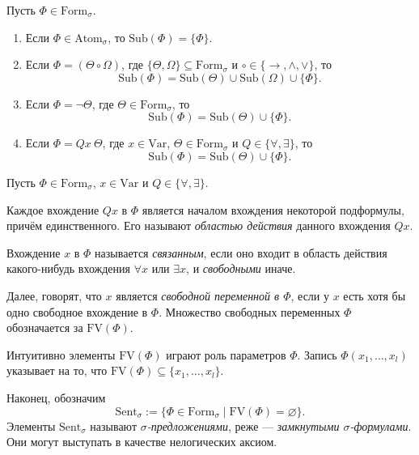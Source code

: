 \documentclass[12pt,a4paper]{article}
\newcommand{\Formul}{\ensuremath{\mathrm{Form}}\xspace}
\newcommand{\Sub}{\ensuremath{\mathrm{Sub}}\xspace}
\newcommand{\Var}{\ensuremath{\mathrm{Var}}\xspace}
\newcommand{\Atom}{\ensuremath{\mathrm{Atom}}\xspace}
\newcommand{\FV}{\ensuremath{\mathrm{FV}}\xspace}
\newcommand{\Sent}{\ensuremath{\mathrm{Sent}}\xspace}
\begin{document}
    \begin{theorem}[о подформулах]
        Пусть $\Phi \in \Formul_\sigma$.
        \begin{enumerate}
            \item Если $\Phi \in \Atom_\sigma$, то $\Sub(\Phi) = \{\Phi\}$.
            \item Если $\Phi = (\Theta \circ \Omega)$, где $\{\Theta, \Omega\} \subseteq \Formul_\sigma$ и ${\circ} \in \{{\rightarrow}, {\wedge}, {\vee}\}$, то
                \[\Sub(\Phi) = \Sub(\Theta) \cup \Sub(\Omega) \cup \{\Phi\}.\]
            \item Если $\Phi = \neg \Theta$, где $\Theta \in \Formul_\sigma$, то
                \[\Sub(\Phi) = \Sub(\Theta) \cup \{\Phi\}.\]
            \item Если $\Phi = Q x\ \Theta$, где $x \in \Var$, $\Theta \in \Formul_\sigma$ и $Q \in \{\forall, \exists\}$, то
                \[\Sub(\Phi) = \Sub(\Theta) \cup \{\Phi\}.\]
        \end{enumerate}
    \end{theorem}

    \begin{definition}
        Пусть $\Phi \in \Formul_\sigma$, $x \in \Var$ и $Q \in \{\forall, \exists\}$.

        Каждое вхождение $Qx$ в $\Phi$ является началом вхождения некоторой подформулы, причём единственного. Его называют \emph{областью действия} данного вхождения $Qx$.

        Вхождение $x$ в $\Phi$ называется \emph{связанным}, если оно входит в область действия какого-нибудь вхождения $\forall x$ или $\exists x$, и \emph{свободными} иначе.

        Далее, говорят, что $x$ является \emph{свободной переменной в $\Phi$}, если у $x$ есть хотя бы одно свободное вхождение в $\Phi$. Множество свободных переменных $\Phi$ обозначается за $\FV(\Phi)$.

        Интуитивно элементы $\FV(\Phi)$ играют роль параметров $\Phi$. Запись $\Phi(x_1, \dots, x_l)$ указывает на то, что $\FV(\Phi) \subseteq \{x_1, \dots, x_l\}$.

        Наконец, обозначим
        \[\Sent_\sigma := \{\Phi \in \Formul_\sigma \mid \FV(\Phi) = \varnothing\}.\]
        Элементы $\Sent_\sigma$ называют \emph{$\sigma$-предложениями}, реже --- \emph{замкнутыми $\sigma$-формулами}. Они могут выступать в качестве нелогических аксиом.
    \end{definition}
        
\end{document}
